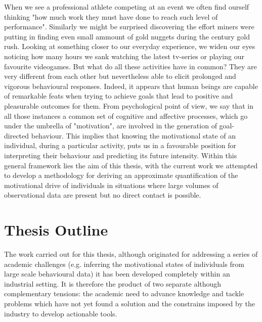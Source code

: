 When we see a professional athlete competing at an event we often find ourself thinking "how much work they must have done to reach such level of performance". Similarly we might be surprised discovering the effort miners were putting in finding even small ammount of gold nuggets during the  century gold rush. Looking at something closer to our everyday experience, we widen our eyes noticing how many hours we sank watching the latest tv-series or playing our favourite videogames. But what do all these activities have in common? They are very different from each other but nevertheless able to elicit prolonged and vigorous behavioural responses. Indeed, it appears that human beings are capable of remarkable feats when trying to achieve goals that lead to positive and pleasurable outcomes for them. From psychological point of view, we say that in all those instances a common set of cognitive and affective processes, which go under the umbrella of "motivation", are involved in the generation of goal-directed behaviour. This implies that knowing the motivational state of an individual, during a particular activity, puts us in a favourable position for interpreting their behaviour and predicting its future intensity. Within this general framework lies the aim of this thesis, with the current work we attempted to develop a methodology for deriving an approximate quantification of the motivational drive of individuals in situations where large volumes of observational data are present but no direct contact is possible.

\section*{Thesis Outline}
The work carried out for this thesis, although originated for addressing a series of academic challenges (e.g. inferring the motivational states of individuals from large scale behavioural data) it has been developed completely within an industrial setting. It is therefore the product of two separate although complementary tensions: the academic need to advance knowledge and tackle problems which have not yet found a solution and the constrains imposed by the industry to develop actionable tools.

